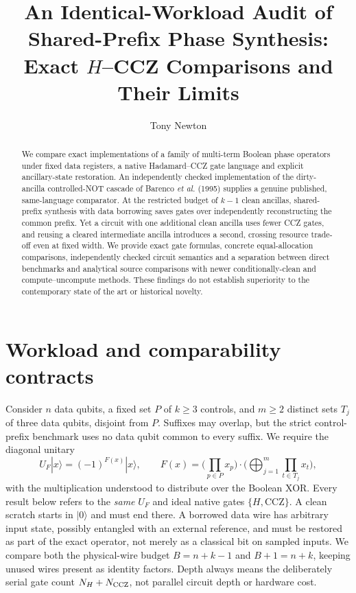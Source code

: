 \documentclass[11pt,a4paper]{article}
\title{An Identical-Workload Audit of Shared-Prefix Phase Synthesis: \\ Exact $H$--CCZ Comparisons and Their Limits}
\author{Tony Newton}
\date{}
\begin{document}
\maketitle
\begin{abstract}
We compare exact implementations of a family of multi-term Boolean phase operators under fixed data registers, a native Hadamard--CCZ gate language and explicit ancillary-state restoration. An independently checked implementation of the dirty-ancilla controlled-NOT cascade of Barenco \emph{et al.} (1995) supplies a genuine published, same-language comparator. At the restricted budget of $k-1$ clean ancillas, shared-prefix synthesis with data borrowing saves gates over independently reconstructing the common prefix. Yet a circuit with one additional clean ancilla uses fewer CCZ gates, and reusing a cleared intermediate ancilla introduces a second, crossing resource trade-off even at fixed width. We provide exact gate formulas, concrete equal-allocation comparisons, independently checked circuit semantics and a separation between direct benchmarks and analytical source comparisons with newer conditionally-clean and compute--uncompute methods. These findings do not establish superiority to the contemporary state of the art or historical novelty.
\end{abstract}

\section{Workload and comparability contracts}
Consider $n$ data qubits, a fixed set $P$ of $k\ge3$ controls, and $m\ge2$ distinct sets $T_j$ of three data qubits, disjoint from $P$. Suffixes may overlap, but the strict control-prefix benchmark uses no data qubit common to every suffix. We require the diagonal unitary
\begin{equation}\label{eq:phase}
 U_F|x\rangle=(-1)^{F(x)}|x\rangle,\qquad
 F(x)=\bigg(\prod_{p\in P}x_p\bigg)
 \cdot\bigg(\bigoplus_{j=1}^{m}\prod_{t\in T_j}x_t\bigg),
\end{equation}
with the multiplication understood to distribute over the Boolean XOR. Every result below refers to the \emph{same} $U_F$ and ideal native gates $\{H,\mathrm{CCZ}\}$. A clean scratch starts in $|0\rangle$ and must end there. A borrowed data wire has arbitrary input state, possibly entangled with an external reference, and must be restored as part of the exact operator, not merely as a classical bit on sampled inputs. We compare both the physical-wire budget $B=n+k-1$ and $B+1=n+k$, keeping unused wires present as identity factors. Depth always means the deliberately serial gate count $N_H+N_{\rm CCZ}$, not parallel circuit depth or hardware cost.
\end{document}
